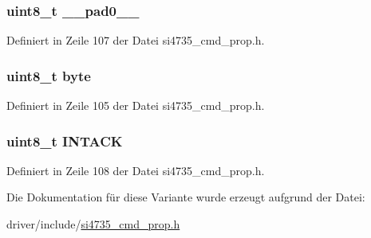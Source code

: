 \subsubsection[{\+\_\+\+\_\+pad0\+\_\+\+\_\+}]{\setlength{\rightskip}{0pt plus 5cm}uint8\+\_\+t \+\_\+\+\_\+pad0\+\_\+\+\_\+}\label{unionfm__rsq__status__arg1_a8b4eebe79ded0459acec2f4950102ba3}


Definiert in Zeile 107 der Datei si4735\+\_\+cmd\+\_\+prop.\+h.

\hypertarget{unionfm__rsq__status__arg1_a96f44d20f1dbf1c8785a7bc99a46164c}{}
\subsubsection[{byte}]{\setlength{\rightskip}{0pt plus 5cm}uint8\+\_\+t byte}\label{unionfm__rsq__status__arg1_a96f44d20f1dbf1c8785a7bc99a46164c}


Definiert in Zeile 105 der Datei si4735\+\_\+cmd\+\_\+prop.\+h.

\hypertarget{unionfm__rsq__status__arg1_adf4f80d8fb205d6c93c6423d84d63d9c}{}
\subsubsection[{I\+N\+T\+A\+C\+K}]{\setlength{\rightskip}{0pt plus 5cm}uint8\+\_\+t I\+N\+T\+A\+C\+K}\label{unionfm__rsq__status__arg1_adf4f80d8fb205d6c93c6423d84d63d9c}


Definiert in Zeile 108 der Datei si4735\+\_\+cmd\+\_\+prop.\+h.



Die Dokumentation für diese Variante wurde erzeugt aufgrund der Datei\+:\begin{DoxyCompactItemize}
\item 
driver/include/\hyperlink{si4735__cmd__prop_8h}{si4735\+\_\+cmd\+\_\+prop.\+h}\end{DoxyCompactItemize}
